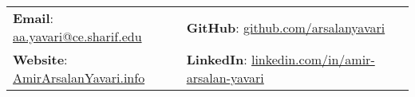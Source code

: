 \documentclass[letterpaper, 11pt]{article}
\begin{document}


\vspace{0.5cm} 
\begin{center}
\begin{tabular}{lll}
\textbf{Email}: \href{mailto:aa.yavari@ce.sharif.edu}{aa.yavari@ce.sharif.edu}     &
\hspace{0.4in} \textbf{GitHub}: \href{https://www.github.com/arsalanyavari}{github.com/arsalanyavari}  \\

\textbf{Website}: \href{https://www.amirarsalanyavari.info}{AmirArsalanYavari.info}  & 
\hspace{0.4in} \textbf{LinkedIn}: \href{https://www.linkedin.com/in/amir-arsalan-yavari}{linkedin.com/in/amir-arsalan-yavari}

\end{tabular}
\end{center}


\setlength{\tabcolsep}{8pt}
\end{document}
